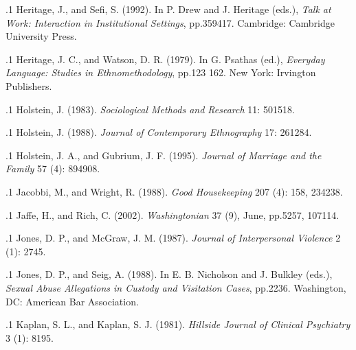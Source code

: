 \documentclass[11pt, twoside]{article}
\begin{document}
{\p.1{%
Heritage, J., and Sefi, S. (1992).  In P. Drew and J. Heritage (eds.), \textit{Talk at Work: Interaction in Institutional
Settings}, pp.\@ 359\ndash{}417. Cambridge: Cambridge University Press.
}%

\p.1{%
Heritage, J. C., and Watson, D. R. (1979). 
In G. Psathas (ed.), \textit{Everyday Language: Studies in Ethnomethodology}, pp.\@ 123\ndash{}
162. New York: Irvington Publishers.
}%

\p.1{%
Holstein, J. (1983).  \textit{Sociological Methods and
Research} 11: 501\ndash{}518.
}%

\p.1{%
Holstein, J. (1988).  \textit{Journal of Contemporary Ethnography} 17: 261\ndash{}284.
}%

\p.1{%
Holstein, J. A., and Gubrium, J. F. (1995).  \textit{Journal of Marriage and the Family} 57 (4):
894\ndash{}908.
}%

\p.1{%
Jacobbi, M., and Wright, R. (1988). 
\textit{Good Housekeeping} 207 (4): 158, 234\ndash{}238.
}%

\p.1{%
Jaffe, H., and Rich, C. (2002).  \textit{Washingtonian} 37 (9),
June, pp.\@ 52\ndash{}57, 107\ndash{}114.
}%

\p.1{%
Jones, D. P., and McGraw, J. M. (1987).  \textit{Journal of Interpersonal Violence} 2 (1): 27\ndash{}45.
}%

\p.1{%
Jones, D. P., and Seig, A. (1988).  In E. B. Nicholson and J. Bulkley (eds.),
\textit{Sexual Abuse Allegations in Custody and Visitation Cases}, pp.\@ 22\ndash{}36. Washington, DC:
American Bar Association.
}%

\p.1{%
Kaplan, S. L., and Kaplan, S. J. (1981).  \textit{Hillside Journal of
Clinical Psychiatry} 3 (1): 81\ndash{}95.
}%

}
\end{document}
